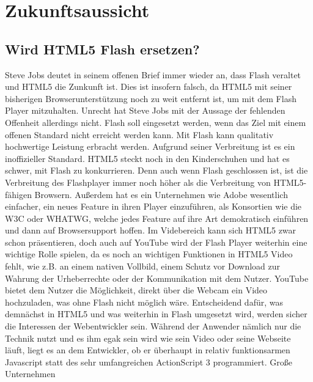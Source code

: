 \chapter{Zukunftsaussicht}

\section{Wird HTML5 Flash ersetzen?}

Steve Jobs deutet in seinem offenen Brief immer wieder an, dass
Flash veraltet und HTML5 die Zunkunft ist. Dies ist insofern falsch,
da HTML5 mit seiner bisherigen Browserunterstützung noch zu weit
entfernt ist, um mit dem Flash Player mitzuhalten. Unrecht hat
Steve Jobs mit der Aussage der fehlenden Offenheit allerdings nicht.
Flash soll eingesetzt werden, wenn das Ziel mit einem offenen
Standard nicht erreicht werden kann. Mit Flash kann qualitativ
hochwertige Leistung erbracht werden. Aufgrund seiner
Verbreitung ist es ein inoffizieller Standard.
\newline\newline
HTML5 steckt noch in den Kinderschuhen und hat es schwer, mit Flash
zu konkurrieren. Denn auch wenn Flash geschlossen ist, ist die Verbreitung
des Flashplayer immer noch höher als die Verbreitung von HTML5-fähigen
Browsern. Außerdem hat es ein Unternehmen wie Adobe wesentlich
einfacher, ein neues Feature in ihren Player einzuführen, als Konsortien wie
die W3C oder WHATWG, welche jedes Feature auf ihre Art demokratisch
einführen und dann auf Browsersupport hoffen.
\newline\newline
Im Videbereich kann sich HTML5 zwar schon präsentieren, doch auch auf
YouTube wird der Flash Player weiterhin eine wichtige Rolle spielen, da es
noch an wichtigen Funktionen in HTML5 Video fehlt, wie z.B. an einem
nativen Vollbild, einem Schutz vor Download zur Wahrung der Urheberrechte
oder der Kommunikation mit dem Nutzer. YouTube bietet dem Nutzer die
Möglichkeit, direkt über die Webcam ein Video hochzuladen, was ohne
Flash nicht möglich wäre.
\newline\newline
Entscheidend dafür, was demnächst in HTML5 und was weiterhin in Flash
umgesetzt wird, werden sicher die Interessen der Webentwickler sein.
Während der Anwender nämlich nur die Technik nutzt und es ihm
egak sein wird wie sein Video oder seine Webseite läuft, liegt es an dem
Entwickler, ob er überhaupt in relativ funktionsarmen Javascript statt
des sehr umfangreichen ActionScript 3 programmiert. Große Unternehmen

